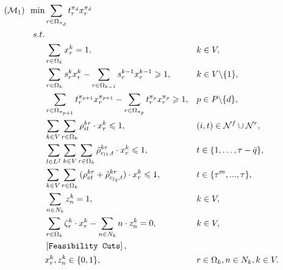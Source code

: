 \documentclass[12pt]{article}
\newcounter{RMPone}
\begin{document}
\begin{subequations}\label{RMP1}
\begin{align}
  \label{m1-obj}(\mathcal{M}_1)\,\ \min&\sum_{r\in \Omega_{\pi_d}}{t^{\pi_d}_r x^{\pi_d}_r} \\%
        s.t.&\quad \nonumber \\
        \label{m1-con1}&\sum_{r\in \Omega_{k}}{x^k_r}=1,\,\ &&k\in V, \\%
        \label{m1-con2}&\sum_{r\in \Omega_{k}}{s^k_r  x^k_r}-\sum_{r\in \Omega_{k-1}}{s^{k-1}_r x^{k-1}_r}\geqslant 1, &&k\in V\backslash\{1\}, \\%
        \label{m1-con3}&\sum_{r\in \Omega_{\pi_{p+1}}}{t^{\pi_{p+1}}_r x^{\pi_{p+1}}_r}-\sum_{r\in \Omega_{\pi_{p}}}{t^{\pi_{p}}_r x^{\pi_{p}}_r}\geqslant 1, &&p\in P\backslash \{d\}, \\%
        \label{m1-con4}&\sum_{k\in V}{\sum_{r\in \Omega_k}{\rho^{kr}_{it} \cdot x^k_r}}\leqslant 1, &&(i,t)\in \mathcal{N}^{f}\cup \mathcal{N}^{r}, \\%
        \label{m1-con5}&\sum_{l\in L^f}{\sum_{k\in V}{\sum_{r\in \Omega_k}{\Tilde{\rho}^{kr}_{c_{l1},t} \cdot x^k_r}}}\leqslant 1, &&t\in \{1,\dots,\tau-\bar{q}\}, \\%
        \label{m1-con6}&\sum_{k\in V}{\sum_{r\in \Omega_{k}}{(\rho^{kr}_{et}+\Tilde{\rho}^{kr}_{c_{\bar{l}\bar{q}},t})\cdot x^{k}_{r}}}\leqslant 1,  &&t\in \{\tau^m,...,\tau \}, \\%
        \label{m1-con7}&\sum_{n\in N_k}{z^k_n}=1, &&k\in V, \\%
        \label{m1-con8}&\sum_{r\in \Omega_k}{\zeta^k_r\cdot x^k_r}-\sum_{n\in N_k}{n\cdot z^k_n}=0, &&k\in V, \\%
        \label{m1-con9}&\left[\texttt{Feasibility Cuts}\right], &&  \\%
        \label{m1-con10}&x^{k}_{r}, z^{k}_{n}\in \{0,1\}, &&r\in \Omega_k, n\in N_k, k\in V.
\end{align}
\end{subequations}
\end{document}
